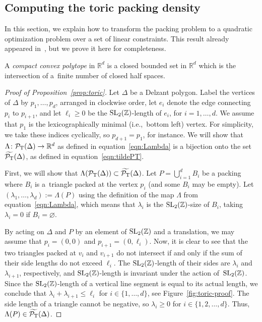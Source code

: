 \documentclass[pdftex]{sigma}
\numberwithin{equation}{section}
\def\R{{\mathbb R}}
\def\Z{{\mathbb Z}}
\newcommand{\De}{\Delta}
\newcommand{\PT}{\mathcal{P}_{\rm T}}
\newcommand{\PTtilde}{\widetilde{\PT}}
\newcommand{\SL}{{\rm SL}_2(\Z)}
\begin{document}
\subsection{Computing the toric packing density}
\label{sec:toric-computing}

In this section, we explain how to transform the packing problem to a quadratic optimization problem over a set of linear constraints.
This result already appeared in~\cite[Proposition 1.4]{PeSc2008}, but we prove it here for completeness.

A \emph{compact convex polytope} in $\R^d$ is a closed bounded set in $\R^d$ which is the intersection of a~finite number of closed half spaces.





\begin{proof}[Proof of Proposition~\ref{prop:toric}]
Let $\De$ be a Delzant polygon. Label the vertices of $\De$ by $p_1,\ldots,p_d$, arranged in clockwise order, let $e_i$ denote the edge connecting $p_i$ to $p_{i+1}$,
and let $\ell_i\geq 0$ be the $\SL$-length of $e_i$, for $i=1,\ldots, d$.
We assume that $p_1$ is the lexicographically minimal (i.e.,~bottom left) vertex.
For simplicity, we take these indices cyclically, so $p_{d+1} = p_1$, for instance.
We will show that $\Lambda\colon \PT(\De)\to\R^d$ as defined in equation~\eqref{eqn:Lambda} is a bijection onto the set $\PTtilde(\De)$, as defined in equation~\eqref{eqn:tildePT}.

First, we will show that $\Lambda(\PT(\De))\subset \PTtilde(\De)$.
Let $P = \bigcup_{i=1}^d B_i$ be a packing where $B_i$ is a~triangle packed at the vertex $p_i$ (and some $B_i$ may be empty).
Let $(\lambda_1,\ldots, \lambda_d):=\Lambda(P)$ using the definition of the map $\Lambda$ from equation~\eqref{eqn:Lambda}, which means that $\lambda_i$ is the $\SL$-size of $B_i$, taking $\lambda_i=0$ if $B_i=\varnothing$.

By acting on $\De$ and $P$ by an element of $\SL$ and a translation, we may assume that $p_i = (0,0)$ and $p_{i+1} = (0,\ell_i)$. Now, it is clear to see that the two triangles packed at $v_i$ and $v_{i+1}$ do not intersect if and only if the sum of their side lengths do not exceed $\ell_i$. The $\SL$-length of their sides are $\lambda_i$ and $\lambda_{i+1}$, respectively, and $\SL$-length is invariant under the action of~$\SL$. Since the $\SL$-length of a vertical line segment is equal to its actual length, we conclude that $\lambda_i + \lambda_{i+1} \leq \ell_i$ for $i\in\{1,\ldots,d\}$,
see Figure~\ref{fig:toric-proof}.
The side length of a triangle cannot be negative, so $\lambda_i \geq 0$ for $i \in \{1,2,\ldots,d\}$. Thus, $\Lambda(P) \in \PTtilde(\De)$.


\end{proof}
\end{document}
